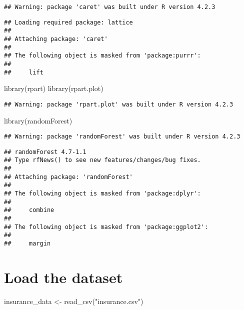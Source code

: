 \documentclass[
]{article}
\newenvironment{Shaded}{\begin{snugshade}}{\end{snugshade}}
\newcommand{\FunctionTok}[1]{\textcolor[rgb]{0.00,0.00,0.00}{#1}}
\newcommand{\NormalTok}[1]{#1}
\newcommand{\OtherTok}[1]{\textcolor[rgb]{0.56,0.35,0.01}{#1}}
\newcommand{\StringTok}[1]{\textcolor[rgb]{0.31,0.60,0.02}{#1}}
\begin{document}
\begin{verbatim}
## Warning: package 'caret' was built under R version 4.2.3
\end{verbatim}

\begin{verbatim}
## Loading required package: lattice
## 
## Attaching package: 'caret'
## 
## The following object is masked from 'package:purrr':
## 
##     lift
\end{verbatim}

\begin{Shaded}
\begin{Highlighting}[]
\FunctionTok{library}\NormalTok{(rpart)}
\FunctionTok{library}\NormalTok{(rpart.plot)}
\end{Highlighting}
\end{Shaded}

\begin{verbatim}
## Warning: package 'rpart.plot' was built under R version 4.2.3
\end{verbatim}

\begin{Shaded}
\begin{Highlighting}[]
\FunctionTok{library}\NormalTok{(randomForest)}
\end{Highlighting}
\end{Shaded}

\begin{verbatim}
## Warning: package 'randomForest' was built under R version 4.2.3
\end{verbatim}

\begin{verbatim}
## randomForest 4.7-1.1
## Type rfNews() to see new features/changes/bug fixes.
## 
## Attaching package: 'randomForest'
## 
## The following object is masked from 'package:dplyr':
## 
##     combine
## 
## The following object is masked from 'package:ggplot2':
## 
##     margin
\end{verbatim}

\hypertarget{load-the-dataset}{%
\section{Load the dataset}\label{load-the-dataset}}

\begin{Shaded}
\begin{Highlighting}[]
\NormalTok{insurance\_data }\OtherTok{\textless{}{-}} \FunctionTok{read\_csv}\NormalTok{(}\StringTok{"insurance.csv"}\NormalTok{)}
\end{Highlighting}
\end{Shaded}
\end{document}
